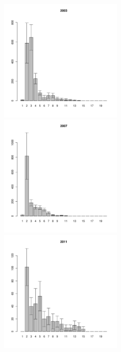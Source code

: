 \documentclass[12pt, a4paper]{article}
\begin{document}
\begin{figure}[h]
\begin{multicols}{3}
\hfill
\includegraphics[width=60mm]{../White_Sea/Ryashkov_YuG/YuG_2003_.pdf}
\hfill
\includegraphics[width=60mm]{../White_Sea/Ryashkov_YuG/YuG_2007_.pdf}
\hfill
\includegraphics[width=60mm]{../White_Sea/Ryashkov_YuG/YuG_2011_.pdf}
\end{multicols}



\end{figure}
\end{document}
